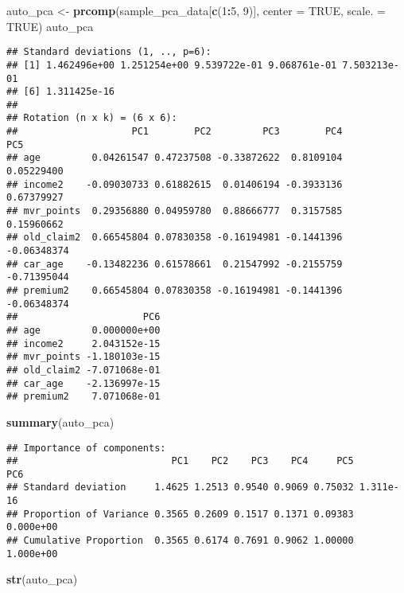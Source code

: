 \documentclass[]{article}
\newenvironment{Shaded}{\begin{snugshade}}{\end{snugshade}}
\newcommand{\KeywordTok}[1]{\textcolor[rgb]{0.13,0.29,0.53}{\textbf{#1}}}
\newcommand{\DataTypeTok}[1]{\textcolor[rgb]{0.13,0.29,0.53}{#1}}
\newcommand{\DecValTok}[1]{\textcolor[rgb]{0.00,0.00,0.81}{#1}}
\newcommand{\StringTok}[1]{\textcolor[rgb]{0.31,0.60,0.02}{#1}}
\newcommand{\OtherTok}[1]{\textcolor[rgb]{0.56,0.35,0.01}{#1}}
\newcommand{\OperatorTok}[1]{\textcolor[rgb]{0.81,0.36,0.00}{\textbf{#1}}}
\newcommand{\NormalTok}[1]{#1}
\begin{document}
\begin{Shaded}
\begin{Highlighting}[]
\NormalTok{auto_pca <-}\StringTok{ }\KeywordTok{prcomp}\NormalTok{(sample_pca_data[}\KeywordTok{c}\NormalTok{(}\DecValTok{1}\OperatorTok{:}\DecValTok{5}\NormalTok{, }\DecValTok{9}\NormalTok{)], }\DataTypeTok{center =} \OtherTok{TRUE}\NormalTok{, }\DataTypeTok{scale. =} \OtherTok{TRUE}\NormalTok{)}
\NormalTok{auto_pca}
\end{Highlighting}
\end{Shaded}

\begin{verbatim}
## Standard deviations (1, .., p=6):
## [1] 1.462496e+00 1.251254e+00 9.539722e-01 9.068761e-01 7.503213e-01
## [6] 1.311425e-16
## 
## Rotation (n x k) = (6 x 6):
##                    PC1        PC2         PC3        PC4         PC5
## age         0.04261547 0.47237508 -0.33872622  0.8109104  0.05229400
## income2    -0.09030733 0.61882615  0.01406194 -0.3933136  0.67379927
## mvr_points  0.29356880 0.04959780  0.88666777  0.3157585  0.15960662
## old_claim2  0.66545804 0.07830358 -0.16194981 -0.1441396 -0.06348374
## car_age    -0.13482236 0.61578661  0.21547992 -0.2155759 -0.71395044
## premium2    0.66545804 0.07830358 -0.16194981 -0.1441396 -0.06348374
##                      PC6
## age         0.000000e+00
## income2     2.043152e-15
## mvr_points -1.180103e-15
## old_claim2 -7.071068e-01
## car_age    -2.136997e-15
## premium2    7.071068e-01
\end{verbatim}

\begin{Shaded}
\begin{Highlighting}[]
\KeywordTok{summary}\NormalTok{(auto_pca)}
\end{Highlighting}
\end{Shaded}

\begin{verbatim}
## Importance of components:
##                           PC1    PC2    PC3    PC4     PC5       PC6
## Standard deviation     1.4625 1.2513 0.9540 0.9069 0.75032 1.311e-16
## Proportion of Variance 0.3565 0.2609 0.1517 0.1371 0.09383 0.000e+00
## Cumulative Proportion  0.3565 0.6174 0.7691 0.9062 1.00000 1.000e+00
\end{verbatim}

\begin{Shaded}
\begin{Highlighting}[]
\KeywordTok{str}\NormalTok{(auto_pca)}
\end{Highlighting}
\end{Shaded}
\end{document}
